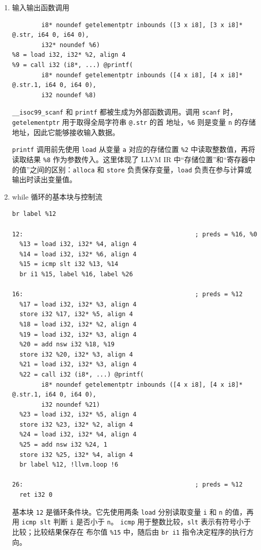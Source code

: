 \documentclass[UTF8,a4paper,10pt]{ctexart}
\begin{document}
\begin{enumerate}[label=\roman*.]
    \item 输入输出函数调用

\begin{lstlisting}[style=asm]
%7 = call i32 (i8*, ...) @__isoc99_scanf(
        i8* noundef getelementptr inbounds ([3 x i8], [3 x i8]* @.str, i64 0, i64 0),
        i32* noundef %6)
%8 = load i32, i32* %2, align 4
%9 = call i32 (i8*, ...) @printf(
        i8* noundef getelementptr inbounds ([4 x i8], [4 x i8]* @.str.1, i64 0, i64 0),
        i32 noundef %8)
\end{lstlisting}

\verb|__isoc99_scanf| 和 \verb|printf| 都被生成为外部函数调用。调用
\verb|scanf| 时，\verb|getelementptr| 用于取得全局字符串 \verb|@.str| 的首
地址，\verb|%6| 则是变量 \verb|n| 的存储地址，因此它能够接收输入数据。

\verb|printf| 调用前先使用 \verb|load| 从变量 \verb|a| 对应的存储位置
\verb|%2| 中读取整数值，再将读取结果 \verb|%8| 作为参数传入。这里体现了
LLVM IR 中“存储位置”和“寄存器中的值”之间的区别：\verb|alloca| 和 \verb|store|
负责保存变量，\verb|load| 负责在参与计算或输出时读出变量值。

    \item while 循环的基本块与控制流

\begin{lstlisting}[style=asm]
  br label %12

12:                                               ; preds = %16, %0
  %13 = load i32, i32* %4, align 4
  %14 = load i32, i32* %6, align 4
  %15 = icmp slt i32 %13, %14
  br i1 %15, label %16, label %26

16:                                               ; preds = %12
  %17 = load i32, i32* %3, align 4
  store i32 %17, i32* %5, align 4
  %18 = load i32, i32* %2, align 4
  %19 = load i32, i32* %3, align 4
  %20 = add nsw i32 %18, %19
  store i32 %20, i32* %3, align 4
  %21 = load i32, i32* %3, align 4
  %22 = call i32 (i8*, ...) @printf(
        i8* noundef getelementptr inbounds ([4 x i8], [4 x i8]* @.str.1, i64 0, i64 0),
        i32 noundef %21)
  %23 = load i32, i32* %5, align 4
  store i32 %23, i32* %2, align 4
  %24 = load i32, i32* %4, align 4
  %25 = add nsw i32 %24, 1
  store i32 %25, i32* %4, align 4
  br label %12, !llvm.loop !6

26:                                               ; preds = %12
  ret i32 0
\end{lstlisting}

基本块 \verb|12| 是循环条件块。它先使用两条 \verb|load| 分别读取变量 \verb|i|
和 \verb|n| 的值，再用 \verb|icmp slt| 判断 \verb|i| 是否小于 \verb|n|。
\verb|icmp| 用于整数比较，\verb|slt| 表示有符号小于比较；比较结果保存在
布尔值 \verb|%15| 中，随后由 \verb|br i1| 指令决定程序的执行方向。


\end{enumerate}
\end{document}
